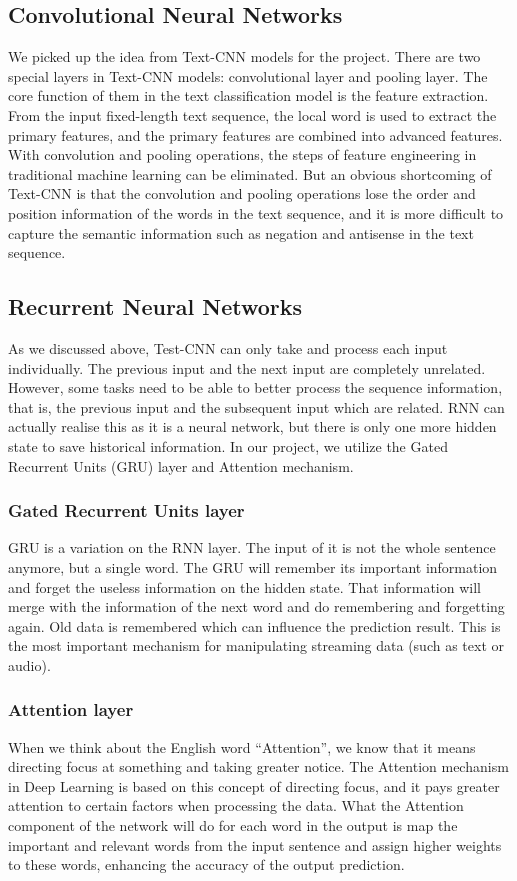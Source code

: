 \documentclass[runningheads]{llncs}
\begin{document}
\subsection{Convolutional Neural Networks}
We picked up the idea from Text-CNN \cite{ref_yoon} models for the project. There are two special layers in Text-CNN models: convolutional layer and pooling layer. The core function of them in the text classification model is the feature extraction. From the input fixed-length text sequence, the local word is used to extract the primary features, and the primary features are combined into advanced features. With convolution and pooling operations, the steps of feature engineering in traditional machine learning can be eliminated. But an obvious shortcoming of Text-CNN is that the convolution and pooling operations lose the order and position information of the words in the text sequence, and it is more difficult to capture the semantic information such as negation and antisense in the text sequence.

\subsection{Recurrent Neural Networks}
As we discussed above, Test-CNN can only take and process each input individually. The previous input and the next input are completely unrelated. However, some tasks need to be able to better process the sequence information, that is, the previous input and the subsequent input which are related. RNN can actually realise this as it is a neural network, but there is only one more hidden state to save historical information. In our project, we utilize the Gated Recurrent Units (GRU) layer and Attention mechanism.

\subsubsection{Gated Recurrent Units layer}
GRU is a variation on the RNN layer. The input of it is not the whole sentence anymore, but a single word. The GRU will remember its important information and forget the useless information on the hidden state. That information will merge with the information of the next word and do remembering and forgetting again. Old data is remembered which can influence the prediction result. This is the most important mechanism for manipulating streaming data (such as text or audio).

\subsubsection{Attention layer}
When we think about the English word ``Attention'', we know that it means directing focus at something and taking greater notice. The Attention mechanism in Deep Learning is based on this concept of directing focus, and it pays greater attention to certain factors when processing the data. What the Attention component of the network will do for each word in the output is map the important and relevant words from the input sentence and assign higher weights to these words, enhancing the accuracy of the output prediction.
\end{document}

